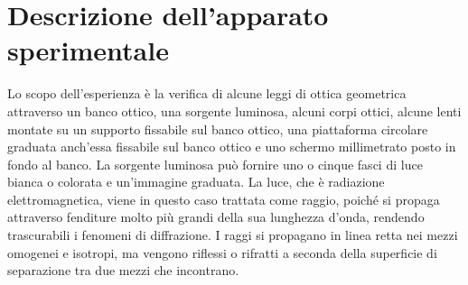 \section{Descrizione dell'apparato sperimentale}
Lo scopo dell'esperienza è la verifica di alcune leggi di ottica geometrica attraverso un banco ottico, una sorgente luminosa, alcuni 
corpi  ottici, alcune lenti montate su un supporto  fissabile  sul  banco  ottico,  una  piattaforma  circolare  graduata  anch'essa 
fissabile  sul  banco  ottico  e  uno  schermo millimetrato posto in fondo al banco. La sorgente luminosa può fornire uno o cinque fasci di luce bianca o colorata e un'immagine graduata. La luce, che è radiazione elettromagnetica, viene in questo caso trattata come raggio, poiché si propaga attraverso fenditure molto più grandi della sua lunghezza d'onda, rendendo trascurabili i fenomeni di diffrazione. I raggi si propagano in linea retta nei mezzi omogenei e isotropi, ma vengono riflessi o rifratti a seconda della superficie di separazione tra due mezzi che incontrano. \\



